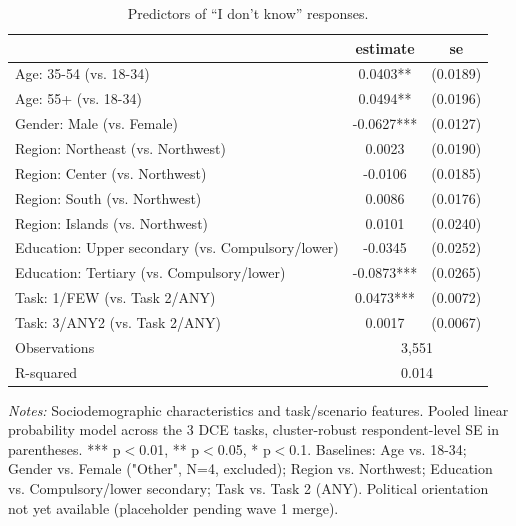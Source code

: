 \begin{table}[H]
    \centering
    \caption{Predictors of ``I don't know'' responses.}
    \begin{tabular}{ l c c }
\hline \hline
 & estimate & se \\
\hline
\hspace{0.05cm} Age: 35-54 (vs. 18-34) & 0.0403** & (0.0189) \\
\hspace{0.05cm} Age: 55+ (vs. 18-34) & 0.0494** & (0.0196) \\
\hspace{0.05cm} Gender: Male (vs. Female) & -0.0627*** & (0.0127) \\
\hspace{0.05cm} Region: Northeast (vs. Northwest) & 0.0023 & (0.0190) \\
\hspace{0.05cm} Region: Center (vs. Northwest) & -0.0106 & (0.0185) \\
\hspace{0.05cm} Region: South (vs. Northwest) & 0.0086 & (0.0176) \\
\hspace{0.05cm} Region: Islands (vs. Northwest) & 0.0101 & (0.0240) \\
\hspace{0.05cm} Education: Upper secondary (vs. Compulsory/lower) & -0.0345 & (0.0252) \\
\hspace{0.05cm} Education: Tertiary (vs. Compulsory/lower) & -0.0873*** & (0.0265) \\
\hspace{0.05cm} Task: 1/FEW (vs. Task 2/ANY) & 0.0473*** & (0.0072) \\
\hspace{0.05cm} Task: 3/ANY2 (vs. Task 2/ANY) & 0.0017 & (0.0067) \\
\hline
\hspace{0.05cm} Observations & \multicolumn{2}{c}{3,551} \\
\hspace{0.05cm} R-squared & \multicolumn{2}{c}{0.014} \\
\hline \hline
\end{tabular}
\begin{tablenotes}
\small
\item \textit{Notes:} Sociodemographic characteristics and task/scenario features. Pooled linear probability model across the 3 DCE tasks, cluster-robust respondent-level SE in parentheses. *** p$<$0.01, ** p$<$0.05, * p$<$0.1. Baselines: Age vs. 18-34; Gender vs. Female ("Other", N=4, excluded); Region vs. Northwest; Education vs. Compulsory/lower secondary; Task vs. Task 2 (ANY). Political orientation not yet available (placeholder pending wave 1 merge).
\end{tablenotes}
    \label{tab:table12}
\end{table}

